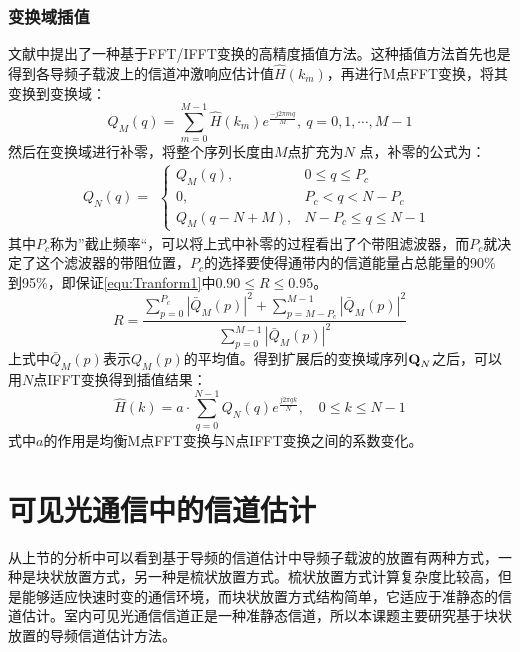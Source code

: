 \subsubsection{变换域插值}
文献中提出了一种基于FFT/IFFT变换的高精度插值方法。这种插值方法首先也是得到各导频子载波上的信道冲激响应估计值$\hat{H}(k_m)$，再进行M点FFT变换，将其变换到变换域：
\begin{equation}
Q_M(q)=\sum_{m=0}^{M-1}\hat{H}(k_m)e^{\frac{-j2\pi mq}{M}},\ q=0,1,\cdots,M-1
\end{equation}
然后在变换域进行补零，将整个序列长度由$M$点扩充为$N$ 点，补零的公式为：
\begin{equation}
Q_N(q)=
\begin{aligned}
\begin{cases}
Q_M(q), &0\leq q \leq P_c \\
0, &P_c < q < N-P_c \\
Q_M(q-N+M),&N-P_c \leq  q \leq N-1
\end{cases}
\end{aligned}
\end{equation}
其中$P_c$称为”截止频率“，可以将上式中补零的过程看出了个带阻滤波器，而$P_c$就决定了这个滤波器的带阻位置，$P_c$的选择要使得通带内的信道能量占总能量的90\% 到95\%，即保证\ref{equ:Tranform1}中$0.90\leq R \leq 0.95$。
\begin{equation}
R=\frac{\sum_{p=0}^{P_c}|\bar{Q}_M(p)|^2+\sum_{p=M-P_c}^{M-1}|\bar{Q}_M(p)|^2}{\sum_{p=0}^{M-1}|\bar{Q}_M(p)|^2}
\label{equ:Tranform1}
\end{equation}
上式中$\bar{Q}_M(p)$表示$Q_M(p)$的平均值。得到扩展后的变换域序列$\textbf Q_N$之后，可以用$N$点IFFT变换得到插值结果：
\begin{equation}
\hat{H}(k) = a\cdot \sum_{q=0}^{N-1}Q_N(q)e^{\frac{j2\pi qk}{N}}, \quad 0\leq k \leq N-1
\end{equation}
式中$a$的作用是均衡M点FFT变换与N点IFFT变换之间的系数变化。
\section{可见光通信中的信道估计}
从上节的分析中可以看到基于导频的信道估计中导频子载波的放置有两种方式，一种是块状放置方式，另一种是梳状放置方式。梳状放置方式计算复杂度比较高，但是能够适应快速时变的通信环境，而块状放置方式结构简单，它适应于准静态的信道估计。室内可见光通信信道正是一种准静态信道，所以本课题主要研究基于块状放置的导频信道估计方法。

